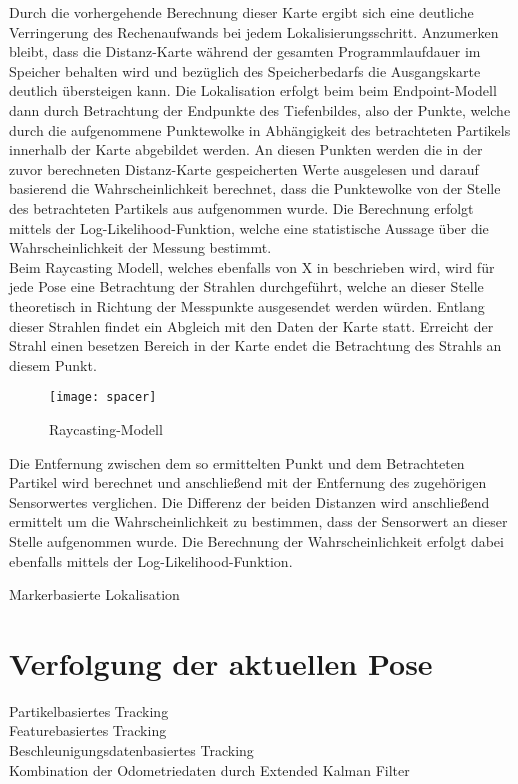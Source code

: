 Durch die vorhergehende Berechnung dieser Karte ergibt sich eine deutliche Verringerung des Rechenaufwands bei jedem Lokalisierungsschritt. Anzumerken bleibt, dass die Distanz-Karte während der gesamten Programmlaufdauer im Speicher behalten wird und bezüglich des Speicherbedarfs die Ausgangskarte deutlich übersteigen kann. Die Lokalisation erfolgt beim beim Endpoint-Modell dann durch Betrachtung der Endpunkte des Tiefenbildes, also der Punkte, welche durch die aufgenommene Punktewolke in Abhängigkeit des betrachteten Partikels innerhalb der Karte abgebildet werden. An diesen Punkten werden die in der zuvor berechneten Distanz-Karte gespeicherten Werte ausgelesen und darauf basierend die Wahrscheinlichkeit berechnet, dass die Punktewolke von der Stelle des betrachteten Partikels aus aufgenommen wurde. Die Berechnung erfolgt mittels der Log-Likelihood-Funktion, welche eine statistische Aussage über die Wahrscheinlichkeit der Messung bestimmt.\\
Beim Raycasting Modell, welches ebenfalls von X in \cite{Raycasting} beschrieben wird, wird für jede Pose eine Betrachtung der Strahlen durchgeführt, welche an dieser Stelle theoretisch in Richtung der Messpunkte ausgesendet werden würden. Entlang dieser Strahlen findet ein Abgleich mit den Daten der Karte statt. Erreicht der Strahl einen besetzen Bereich in der Karte endet die Betrachtung des Strahls an diesem Punkt.\\

\begin{figure}[!ht]
	\begin{center}
		\texttt{[image: spacer]}
		\caption{Raycasting-Modell}
		\label{fig.raycast}
	\end{center}
\end{figure}

Die Entfernung zwischen dem so ermittelten Punkt und dem Betrachteten Partikel wird berechnet und anschließend mit der Entfernung des zugehörigen Sensorwertes verglichen. Die Differenz der beiden Distanzen wird anschließend ermittelt um die Wahrscheinlichkeit zu bestimmen, dass der Sensorwert an dieser Stelle aufgenommen wurde. Die Berechnung der Wahrscheinlichkeit erfolgt dabei ebenfalls mittels der Log-Likelihood-Funktion.\\

Markerbasierte Lokalisation\\

\section{Verfolgung der aktuellen Pose}
Partikelbasiertes Tracking\\
Featurebasiertes Tracking\\
Beschleunigungsdatenbasiertes Tracking\\
Kombination der Odometriedaten durch Extended Kalman Filter \\